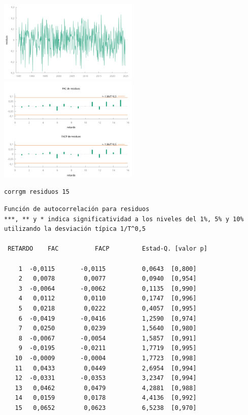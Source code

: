 \documentclass[10pt]{article}
\begin{document}
\begin{center}
\includegraphics[width=0.5\textwidth]{./EjercicioIdentificacionModeloARIMA/Residuos.png}
\includegraphics[width=0.5\textwidth]{./EjercicioIdentificacionModeloARIMA/residuosACF-PACF.png}
\end{center}

\begin{verbatim}
corrgm residuos 15
\end{verbatim}


\begin{verbatim}
Función de autocorrelación para residuos
***, ** y * indica significatividad a los niveles del 1%, 5% y 10%
utilizando la desviación típica 1/T^0,5

 RETARDO    FAC          FACP         Estad-Q. [valor p]

    1  -0,0115       -0,0115          0,0643  [0,800]
    2   0,0078        0,0077          0,0940  [0,954]
    3  -0,0064       -0,0062          0,1135  [0,990]
    4   0,0112        0,0110          0,1747  [0,996]
    5   0,0218        0,0222          0,4057  [0,995]
    6  -0,0419       -0,0416          1,2590  [0,974]
    7   0,0250        0,0239          1,5640  [0,980]
    8  -0,0067       -0,0054          1,5857  [0,991]
    9  -0,0195       -0,0211          1,7719  [0,995]
   10  -0,0009       -0,0004          1,7723  [0,998]
   11   0,0433        0,0449          2,6954  [0,994]
   12  -0,0331       -0,0353          3,2347  [0,994]
   13   0,0462        0,0479          4,2881  [0,988]
   14   0,0159        0,0178          4,4136  [0,992]
   15   0,0652        0,0623          6,5238  [0,970]
\end{verbatim}
\end{document}
